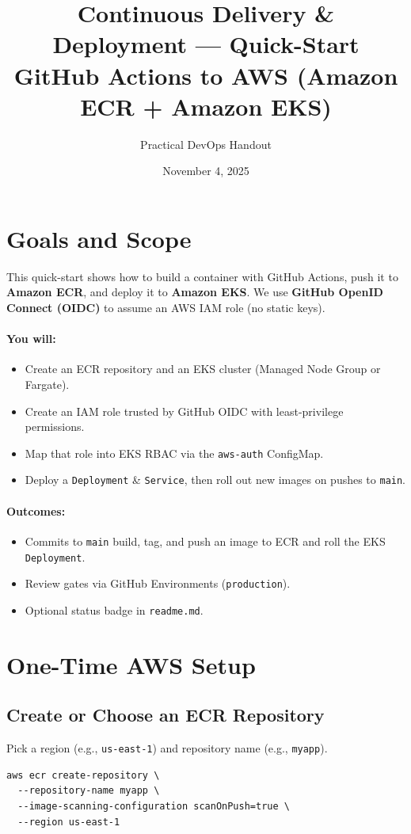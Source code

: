 \documentclass[11pt]{article}
\title{Continuous Delivery \& Deployment --- Quick-Start\\
GitHub Actions to AWS (Amazon ECR + Amazon EKS)}
\author{Practical DevOps Handout}
\date{November 4, 2025}
\begin{document}
\maketitle
\tableofcontents
\clearpage

\section{Goals and Scope}
This quick-start shows how to build a container with GitHub Actions, push it to \textbf{Amazon ECR}, and deploy it to \textbf{Amazon EKS}. We use \textbf{GitHub OpenID Connect (OIDC)} to assume an AWS IAM role (no static keys).

\paragraph{You will:}
\begin{itemize}
  \item Create an ECR repository and an EKS cluster (Managed Node Group or Fargate).
  \item Create an IAM role trusted by GitHub OIDC with least-privilege permissions.
  \item Map that role into EKS RBAC via the \texttt{aws-auth} ConfigMap.
  \item Deploy a \texttt{Deployment} \& \texttt{Service}, then roll out new images on pushes to \texttt{main}.
\end{itemize}

\paragraph{Outcomes:}
\begin{itemize}
  \item Commits to \texttt{main} build, tag, and push an image to ECR and roll the EKS \texttt{Deployment}.
  \item Review gates via GitHub Environments (\texttt{production}).
  \item Optional status badge in \texttt{readme.md}.
\end{itemize}

\section{One-Time AWS Setup}
\subsection{Create or Choose an ECR Repository}
Pick a region (e.g., \texttt{us-east-1}) and repository name (e.g., \texttt{myapp}).
\begin{verbatim}
aws ecr create-repository \
  --repository-name myapp \
  --image-scanning-configuration scanOnPush=true \
  --region us-east-1
\end{verbatim}
\end{document}
